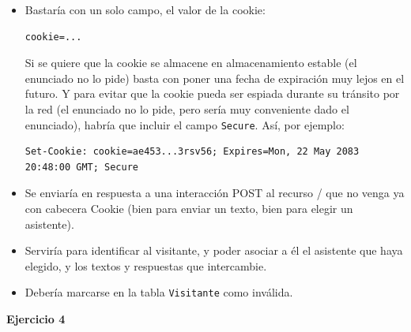 \begin{itemize}
\item[(a)] Bastaría con un solo campo, el valor de la cookie:

\begin{verbatim}
cookie=...
\end{verbatim}

  Si se quiere que la cookie se almacene en almacenamiento estable (el enunciado no lo pide) basta con poner una fecha de expiración muy lejos en el futuro. Y para evitar que la cookie pueda ser espiada durante su tránsito por la red (el enunciado no lo pide, pero sería muy conveniente dado el enunciado), habría que incluir el campo \texttt{Secure}. Así, por ejemplo:

\begin{verbatim}
Set-Cookie: cookie=ae453...3rsv56; Expires=Mon, 22 May 2083 20:48:00 GMT; Secure
\end{verbatim}

\item[(b)] Se enviaría en respuesta a una interacción POST al recurso / que no venga ya con cabecera Cookie (bien para enviar un texto, bien para elegir un asistente).

\item[(c)] Serviría para identificar al visitante, y poder asociar a él el asistente que haya elegido, y los textos y respuestas que intercambie.

\item[(d)] Debería marcarse en la tabla \texttt{Visitante} como inválida.
  
\end{itemize}

\textbf{Ejercicio 4}

